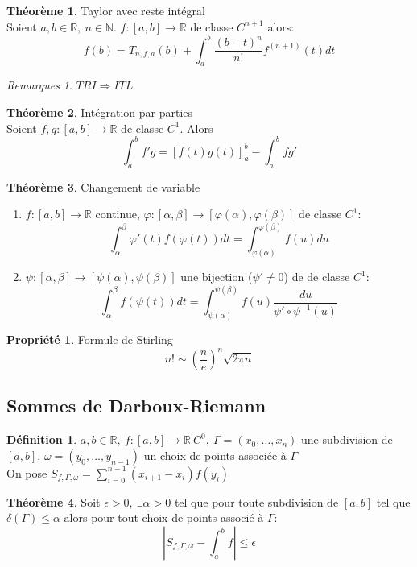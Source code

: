 \documentclass[fleqn]{article}
\theoremstyle{definition} \newtheorem*{defi}{D\'efinition}
\theoremstyle{definition} \newtheorem*{theo}{Th\'eor\`eme}
\theoremstyle{definition} \newtheorem*{coro}{Corollaire}
\theoremstyle{remark} \newtheorem*{rqs}{Remarques}
\theoremstyle{definition} \newtheorem*{prop}{Propri\'et\'e}
\begin{document}
\begin{theo} Taylor avec reste int\'egral \\
	Soient $a,b \in \mathbb{R},\ n \in \mathbb{N}$. $f:[a,b] \rightarrow \mathbb{R}$ de classe $C^{n+1}$ alors:
	\[f(b) = T_{n,f,a}(b) + \int_a^b \frac{(b-t)^n}{n!} f^{(n+1)} (t)dt\]
	\begin{rqs}
		$TRI \Rightarrow ITL$
	\end{rqs}
\end{theo}

\begin{theo} Int\'egration par parties \\
	Soient $f,g: [a,b] \rightarrow \mathbb{R}$ de classe $C^1$. Alors
	\[\int_a^b f'g = [f(t)g(t)]_a^b - \int_a^b fg'\]
\end{theo}

\begin{theo} Changement de variable
	\begin{enumerate}
		\item $f:[a,b] \rightarrow \mathbb{R}$ continue, $\varphi:[\alpha, \beta] \rightarrow [\varphi(\alpha), \varphi(\beta)]$ de classe $C^1$:
			\[\int_\alpha^\beta \varphi '(t) f(\varphi(t)) dt = \int_{\varphi(\alpha)}^{\varphi(\beta)} f(u)du\]
		\item $\psi:[\alpha, \beta] \rightarrow [\psi(\alpha), \psi(\beta)]$ une bijection ($\psi ' \neq 0$) de de classe $C^1$:
			\[\int_\alpha^\beta f(\psi(t)) dt = \int_{\psi(\alpha)}^{\psi(\beta)} f(u)\frac{du}{\psi' \circ \psi^{-1} (u)}\]
	\end{enumerate}
\end{theo}

\begin{prop} Formule de Stirling
	\[n! \sim (\frac{n}{e})^n \sqrt{2\pi n}\]
\end{prop}

\subsection{Sommes de Darboux-Riemann}
\begin{defi}
	$a,b \in \mathbb{R},\ f:[a,b] \rightarrow \mathbb{R}\ C^0,\ \Gamma = (x_0 ,\hdots, x_n)$ une subdivision de $[a,b]$, $\omega = (y_0, \hdots, y_{n-1})$ un choix de
	points associ\'ee \`a $\Gamma$ \\
	On pose $S_{f,\Gamma, \omega} = \sum_{i=0}^{n-1} (x_{i+1} - x_i) f(y_i)$
\end{defi}
\begin{theo}
	Soit $\epsilon > 0,\ \exists \alpha > 0$ tel que pour toute subdivision de $[a,b]$ tel que $\delta(\Gamma) \leq \alpha$ alors
	pour tout choix de points associ\'e \`a $\Gamma$:
	\[|S_{f,\Gamma, \omega} - \int_a^b f| \leq \epsilon\]
\end{theo}
\end{document}
